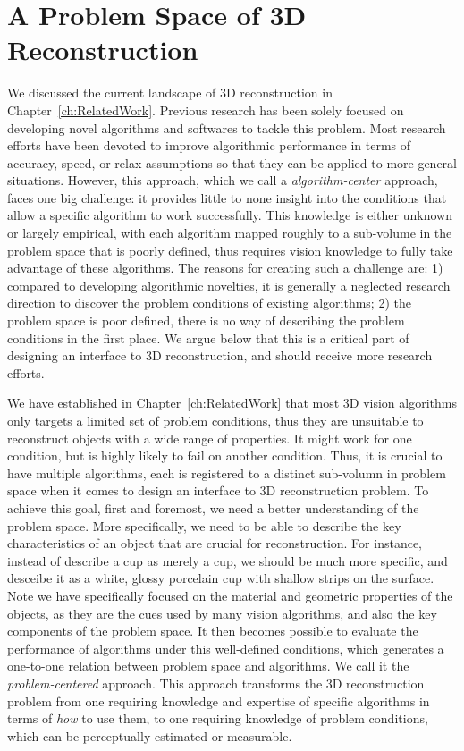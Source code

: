 
\chapter{A Problem Space of 3D Reconstruction}
\label{ch:3DRecon_ProbSpace}
We discussed the current landscape of 3D reconstruction in Chapter~\ref{ch:RelatedWork}. Previous research has been solely focused on developing novel algorithms and softwares to tackle this problem. Most research efforts have been devoted to improve algorithmic performance in terms of accuracy, speed, or relax assumptions so that they can be applied to more general situations. However, this approach, which we call a \textit{algorithm-center} approach, faces one big challenge: it provides little to none insight into the conditions that allow a specific algorithm to work successfully. This knowledge is either unknown or largely empirical, with each algorithm mapped roughly to a sub-volume in the problem space that is poorly defined, thus requires vision knowledge to fully take advantage of these algorithms. The reasons for creating such a challenge are: 1) compared to developing algorithmic novelties, it is generally a neglected research direction to discover the problem conditions of existing algorithms; 2) the problem space is poor defined, there is no way of describing the problem conditions in the first place. We argue below that this is a critical part of designing an interface to 3D reconstruction, and should receive more research efforts. 

We have established in Chapter~\ref{ch:RelatedWork} that most 3D vision algorithms only targets a limited set of problem conditions, thus they are unsuitable to reconstruct objects with a wide range of properties. It might work for one condition, but is highly likely to fail on another condition. Thus, it is crucial to have multiple algorithms, each is registered to a distinct sub-volumn in problem space when it comes to design an interface to 3D reconstruction problem. To achieve this goal, first and foremost, we need a better understanding of the problem space. More specifically, we need to be able to describe the key characteristics of an object that are crucial for reconstruction. For instance, instead of describe a cup as merely a cup, we should be much more specific, and desceibe it as a white, glossy porcelain cup with shallow strips on the surface. Note we have specifically focused on the material and geometric properties of the objects, as they are the cues used by many vision algorithms, and also the key components of the problem space. It then becomes possible to evaluate the performance of algorithms under this well-defined conditions, which generates a one-to-one relation between problem space and algorithms. We call it the \textit{problem-centered} approach. This approach transforms the 3D reconstruction problem from one requiring knowledge and expertise of specific algorithms in terms of \textit{how} to use them, to one requiring knowledge of problem conditions, which can be perceptually estimated or measurable.


